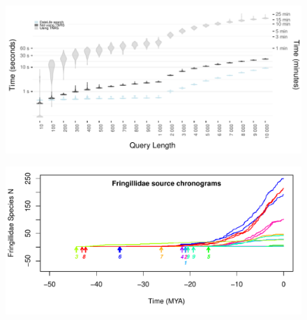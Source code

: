 \documentclass[]{article}
\begin{document}
\newpage

\begin{figure}[!h]
\includegraphics[width=1\linewidth]{fig_runtime1.pdf}
\caption{}
\label{fig:runtime1}
\end{figure}

\newpage

\begin{figure}[!h]
\includegraphics[width=1\linewidth]{fig_schronograms1.pdf}
\caption{}
\label{fig:schronograms1}
\end{figure}

\newpage
\end{document}

